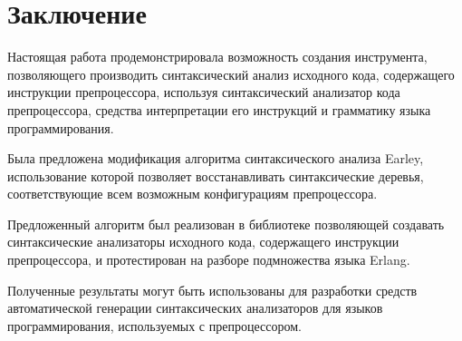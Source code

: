 \clearpage

\section{Заключение}

Настоящая работа продемонстрировала возможность создания инструмента, позволяющего производить синтаксический анализ исходного кода, содержащего инструкции препроцессора, используя синтаксический анализатор кода препроцессора, средства интерпретации его инструкций и грамматику языка программирования.

Была предложена модификация алгоритма синтаксического анализа Earley, использование которой позволяет восстанавливать синтаксические деревья, соответствующие всем возможным конфигурациям препроцессора.

Предложенный алгоритм был реализован в библиотеке позволяющей создавать синтаксические анализаторы исходного кода, содержащего инструкции препроцессора, и протестирован на разборе подмножества языка Erlang.

Полученные результаты могут быть использованы для разработки средств автоматической генерации синтаксических анализаторов для языков программирования, используемых с препроцессором.
